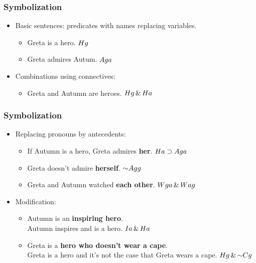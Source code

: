\begin{frame}
\frametitle{Symbolization}

\begin{itemize}[<+->]
\item Basic sentences: predicates with names replacing variables.
\begin{itemize}[<+->]
  \item Greta is a hero. \alert{$Hg$}
  \item Greta admires Autum. \alert{$Aga$}
\end{itemize}
\item Combinations using connectives:
\begin{itemize}[<+->]
  \item Greta and Autumn are heroes. \alert{$Hg \,\&\, Ha$}
\end{itemize}
  \end{itemize}
\end{frame}

\begin{frame}
\frametitle{Symbolization}

\begin{itemize}[<+->]
\item Replacing pronouns by antecedents:
\begin{itemize}[<+->]
  \item If Autumn is a hero, Greta admires \textbf{her}. \alert{$Ha \supset Aga$}
  \item Greta doesn't admire \textbf{herself}. \alert{$\enot A\qr{g}{g}$}
  \item Greta and Autumn watched \textbf{each other}. \alert{$Wga \,\&\, Wag$}
\end{itemize}
\item Modification:
\begin{itemize}[<+->]
  \item Autumn is an \textbf{inspiring hero}.\\
  Autumn inspires and is a hero. \alert{$Ia \,\&\, Ha$}
  \item Greta is a \textbf{hero who doesn't wear a cape}.\\
   Greta is a hero and it's not the case that Greta wears a cape.
   \alert{$H\qv{g} \eand \enot C\qv{g}$}
\end{itemize}
\end{itemize}
\end{frame}


